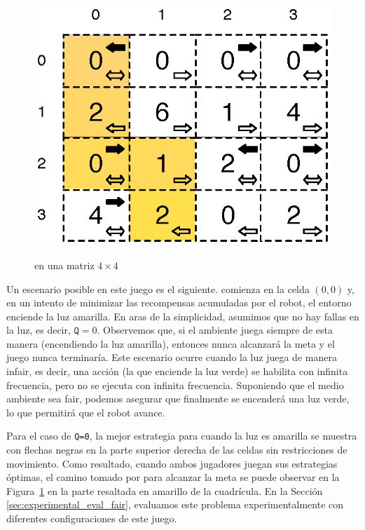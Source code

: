 \begin{figure}
\centering
{\fontsize{6.6}{6.6}\selectfont\ttfamily
\includegraphics[scale=0.65]{Figs/robotMovesRewards.eps}\hspace{1em}\mbox{}}
\caption{\roborta en una matriz $4 \times 4$} \label{fig:robot_game_grid}
\end{figure}

Un escenario posible en este juego es el siguiente. \roborta comienza en la celda $(0,0)$ y, en un intento de minimizar las recompensas acumuladas por el robot, el entorno enciende la luz amarilla.
En aras de la simplicidad, asumimos que no hay fallas en la luz, es decir, $\texttt{Q}=0$.
Observemos que, si el ambiente juega siempre de esta manera (encendiendo la luz amarilla), entonces \roborta nunca alcanzará la meta y
el juego nunca terminaría. Este escenario ocurre cuando la luz juega de manera infair, es decir, una acción (la que enciende la luz verde) se habilita con infinita frecuencia, pero no se ejecuta con infinita frecuencia.
Suponiendo que el medio ambiente sea fair, podemos asegurar que finalmente se encenderá una luz verde, lo que permitirá que el robot avance.

Para el caso de \texttt{Q=0}, la mejor estrategia para \roborta cuando la luz es amarilla se muestra con flechas negras en la parte superior derecha de las celdas sin restricciones de movimiento.
Como resultado, cuando ambos jugadores juegan sus estrategias óptimas, el camino tomado por \roborta para alcanzar la meta se puede observar en la Figura~\ref{fig:robot_game_grid} en la parte resaltada en amarillo de la cuadrícula. En la Sección \ref{sec:experimental_eval_fair}, evaluamos este problema experimentalmente con diferentes
configuraciones de este juego.